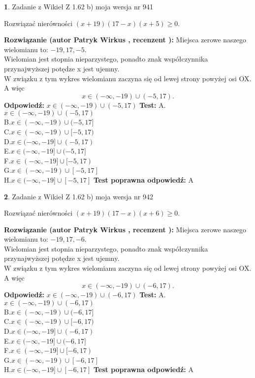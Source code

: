 \documentclass[12pt, a4paper]{article}
\theoremstyle{definition} %
\newtheorem{zad}{}
\newcommand{\zadStart}[1]{\begin{zad}#1\newline}
\newcommand{\zadStop}{\end{zad}}
\newcommand{\rozwStart}[2]{\noindent \textbf{Rozwiązanie (autor #1 , recenzent #2): }\newline}
\newcommand{\rozwStop}{\newline}
\newcommand{\odpStart}{\noindent \textbf{Odpowiedź:}\newline}
\newcommand{\odpStop}{\newline}
\newcommand{\testStart}{\noindent \textbf{Test:}\newline}
\newcommand{\testStop}{\newline}
\newcommand{\kluczStart}{\noindent \textbf{Test poprawna odpowiedź:}\newline}
\newcommand{\kluczStop}{\newline}
\begin{document}
\zadStart{Zadanie z Wikieł Z 1.62 b) moja wersja nr 941}

Rozwiązać nierówności $(x+19)(17-x)(x+5)\ge0$.
\zadStop
\rozwStart{Patryk Wirkus}{}
Miejsca zerowe naszego wielomianu to: $-19, 17, -5$.\\
Wielomian jest stopnia nieparzystego, ponadto znak współczynnika przy\linebreak najwyższej potędze x jest ujemny.\\ W związku z tym wykres wielomianu zaczyna się od lewej strony powyżej osi OX. A więc $$x \in (-\infty,-19) \cup (-5,17).$$
\rozwStop
\odpStart
$x \in (-\infty,-19) \cup (-5,17)$
\odpStop
\testStart
A.$x \in (-\infty,-19) \cup (-5,17)$\\
B.$x \in (-\infty,-19) \cup (-5,17]$\\
C.$x \in (-\infty,-19) \cup [-5,17)$\\
D.$x \in (-\infty,-19] \cup (-5,17)$\\
E.$x \in (-\infty,-19] \cup (-5,17]$\\
F.$x \in (-\infty,-19] \cup [-5,17)$\\
G.$x \in (-\infty,-19) \cup [-5,17]$\\
H.$x \in (-\infty,-19] \cup [-5,17]$
\testStop
\kluczStart
A
\kluczStop



\zadStart{Zadanie z Wikieł Z 1.62 b) moja wersja nr 942}

Rozwiązać nierówności $(x+19)(17-x)(x+6)\ge0$.
\zadStop
\rozwStart{Patryk Wirkus}{}
Miejsca zerowe naszego wielomianu to: $-19, 17, -6$.\\
Wielomian jest stopnia nieparzystego, ponadto znak współczynnika przy\linebreak najwyższej potędze x jest ujemny.\\ W związku z tym wykres wielomianu zaczyna się od lewej strony powyżej osi OX. A więc $$x \in (-\infty,-19) \cup (-6,17).$$
\rozwStop
\odpStart
$x \in (-\infty,-19) \cup (-6,17)$
\odpStop
\testStart
A.$x \in (-\infty,-19) \cup (-6,17)$\\
B.$x \in (-\infty,-19) \cup (-6,17]$\\
C.$x \in (-\infty,-19) \cup [-6,17)$\\
D.$x \in (-\infty,-19] \cup (-6,17)$\\
E.$x \in (-\infty,-19] \cup (-6,17]$\\
F.$x \in (-\infty,-19] \cup [-6,17)$\\
G.$x \in (-\infty,-19) \cup [-6,17]$\\
H.$x \in (-\infty,-19] \cup [-6,17]$
\testStop
\kluczStart
A
\kluczStop
\end{document}
